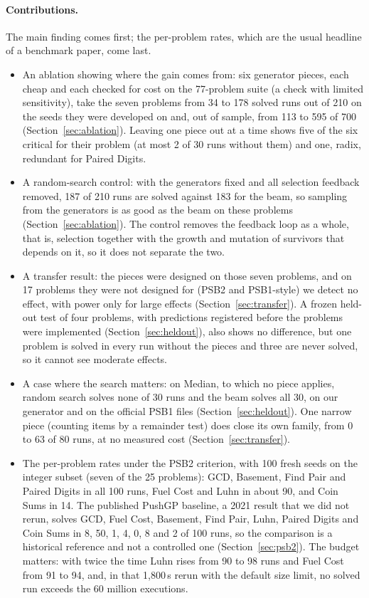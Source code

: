 \documentclass[sigconf,nonacm]{acmart}
\begin{document}
\paragraph{Contributions.}
The main finding comes first; the per-problem rates, which are the usual headline of a benchmark paper, come last.
\begin{itemize}
  \item An ablation showing where the gain comes from: six generator pieces, each cheap and each checked for cost on the 77-problem suite
        (a check with limited sensitivity), take the seven problems from 34 to 178 solved runs out of 210 on the seeds they were developed on and, out of sample, from 113 to 595 of 700 (Section~\ref{sec:ablation}). Leaving one piece out at a time shows five of the six critical for their problem (at most 2 of 30 runs without them) and one, radix, redundant for Paired Digits.
  \item A random-search control: with the generators fixed and all selection feedback removed, 187 of 210 runs are solved against 183 for the beam, so sampling from the generators is as good as the beam on these problems (Section~\ref{sec:ablation}). The control removes the feedback loop as a whole, that is, selection together with the growth and mutation of survivors that depends on it, so it does not separate the two.
  \item A transfer result: the pieces were designed on those seven problems, and
        on 17 problems they were not designed for (PSB2 and PSB1-style) we detect no effect, with power only for large effects (Section~\ref{sec:transfer}). A frozen held-out test of four problems, with predictions registered before the problems were implemented (Section~\ref{sec:heldout}), also shows no difference, but one problem is solved in every run without the pieces and three are never solved, so it cannot see moderate effects.
  \item A case where the search matters: on Median, to which no piece applies, random search solves none of 30 runs and the beam solves all 30, on our generator and on the official PSB1 files (Section~\ref{sec:heldout}). One narrow piece (counting items by a remainder test) does close its own family, from 0 to 63 of 80 runs, at no measured cost (Section~\ref{sec:transfer}).
  \item The per-problem rates under the PSB2 criterion, with 100 fresh seeds on the integer subset (seven of the 25 problems): GCD, Basement, Find Pair and Paired Digits in all 100 runs, Fuel Cost and Luhn in about 90, and Coin Sums in 14. The published PushGP baseline, a 2021 result that we did not rerun, solves GCD, Fuel Cost, Basement, Find Pair, Luhn, Paired Digits and Coin Sums in 8, 50, 1, 4, 0, 8 and 2 of 100 runs, so the comparison is a historical reference and not a controlled one (Section~\ref{sec:psb2}). The budget matters: with twice the time Luhn rises from 90 to 98 runs and Fuel Cost from 91 to 94, and, in that 1,800\,s rerun with the default size limit, no solved run exceeds the 60 million executions.

\end{itemize}
\end{document}
